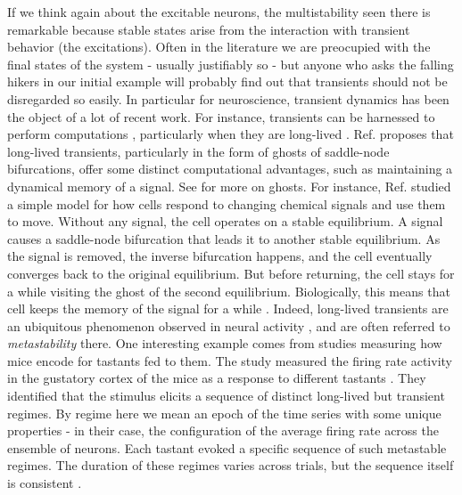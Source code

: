 If we think again about the excitable neurons, the multistability seen there is remarkable because stable states arise from the interaction with transient behavior (the excitations). Often in the literature we are preocupied with the final states of the system - usually justifiably so - but anyone who asks the falling hikers in our initial example will probably find out that transients should not be disregarded so easily. In particular for neuroscience, transient dynamics has been the object of a lot of recent work. For instance, transients can be harnessed to perform computations \cite{budzinski2023an}, particularly when they are long-lived \cite{koch2024biological}. Ref. \cite{koch2024biological} proposes that long-lived transients, particularly in the form of ghosts of saddle-node bifurcations, offer some distinct computational advantages, such as maintaining a dynamical memory of a signal. See  for more on ghosts. For instance, Ref. \cite{nandan2022cells} studied a simple model for how cells respond to changing chemical signals and use them to move. Without any signal, the cell operates on a stable equilibrium. A signal causes a saddle-node bifurcation that leads it to another stable equilibrium. As the signal is removed, the inverse bifurcation happens, and the cell eventually converges back to the original equilibrium. But before returning, the cell stays for a while visiting the ghost of the second equilibrium. Biologically, this means that cell keeps the memory of the signal for a while \cite{nandan2022cells, koch2024biological}.
Indeed, long-lived transients are an ubiquitous phenomenon observed in neural activity \cite{tognoli2014metastable, brinkman2022metastable}, and are often referred to \textit{metastability} there. One interesting example comes from studies measuring how mice encode for tastants fed to them. The study measured the firing rate activity in the gustatory cortex of the mice as a response to different tastants \cite{jones2007natural}. They identified that the stimulus elicits a sequence of distinct long-lived but transient regimes. By regime here we mean an epoch of the time series with some unique properties - in their case, the configuration of the average firing rate across the ensemble of neurons. Each tastant evoked a specific sequence of such metastable regimes. The duration of these regimes varies across trials, but the sequence itself is consistent \cite{lacamera2019cortical, brinkman2022metastable}.

